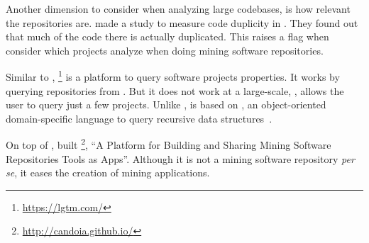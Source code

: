 Another dimension to consider when analyzing large codebases, is how relevant the repositories are.
\cite{Lopes:2017:DMC:3152284.3133908} made a study to measure code duplicity in \github{}.
They found out that much of the code there is actually duplicated.
This raises a flag when consider which projects analyze when doing mining software repositories.

Similar to \boa{}, \lgtm{}\footnote{\url{https://lgtm.com/}} is a platform to query software projects properties.
It works by querying repositories from \github{}.
But it does not work at a large-scale, \ie{}, \lgtm{} allows the user to query just a few projects.
Unlike \boa{}, \lgtm{} is based on \ql{}, an object-oriented domain-specific language to query recursive data structures~\cite{avgustinov_et_al:LIPIcs:2016:6096}.

On top of \boa{}, \cite{7962355} built \candoia{}\footnote{\url{http://candoia.github.io/}}, ``A Platform for Building and Sharing Mining Software Repositories Tools as Apps''.
Although it is not a mining software repository \emph{per se}, it eases the creation of mining applications.
